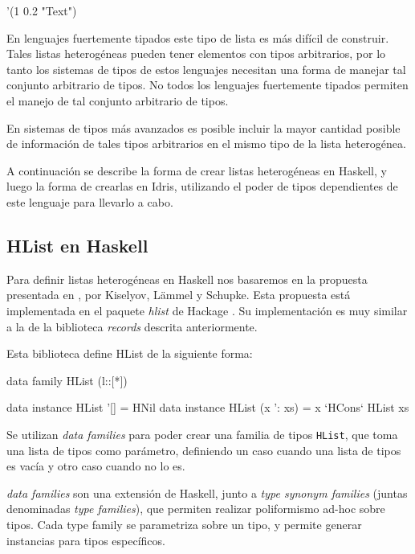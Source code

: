 \begin{code}
'(1 0.2 "Text")
\end{code}

En lenguajes fuertemente tipados este tipo de lista es más difícil de construir. Tales listas heterogéneas pueden tener elementos con tipos arbitrarios, por lo tanto los sistemas de tipos de estos lenguajes necesitan una forma de manejar tal conjunto arbitrario de tipos. No todos los lenguajes fuertemente tipados permiten el manejo de tal conjunto arbitrario de tipos.

En sistemas de tipos más avanzados es posible incluir la mayor cantidad posible de información de tales tipos arbitrarios en el mismo tipo de la lista heterogénea.

A continuación se describe la forma de crear listas heterogéneas en Haskell, y luego la forma de crearlas en Idris, utilizando el poder de tipos dependientes de este lenguaje para llevarlo a cabo.

\subsection{HList en Haskell}

Para definir listas heterogéneas en Haskell nos basaremos en la propuesta presentada en \cite{Kiselyov:2004:STH:1017472.1017488}, por Kiselyov, L\"{a}mmel y Schupke. Esta propuesta está implementada en el paquete \textit{hlist} de Hackage \cite{HListHackage}. Su implementación es muy similar a la de la biblioteca \textit{records} descrita anteriormente.

Esta biblioteca define HList de la siguiente forma:

\begin{code}
data family HList (l::[*])

data instance HList '[] = HNil
data instance HList (x ': xs) = x `HCons` HList xs
\end{code}

Se utilizan \textit{data families} para poder crear una familia de tipos \texttt{HList}, que toma una lista de tipos como parámetro, definiendo un caso cuando una lista de tipos es vacía y otro caso cuando no lo es.

\textit{data families} son una extensión de Haskell, junto a \textit{type synonym families} (juntas denominadas \textit{type families}), que permiten realizar poliformismo ad-hoc sobre tipos. Cada type family se parametriza sobre un tipo, y permite generar instancias para tipos específicos.

